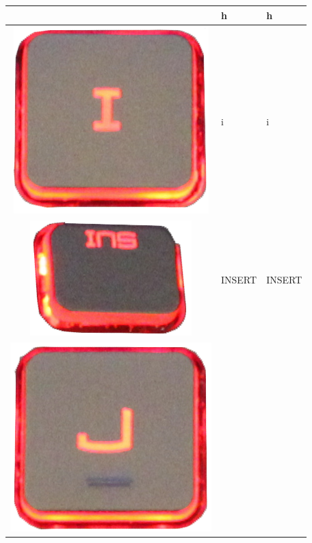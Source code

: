 \begin{longtable}{|cll|}
\begin{minipage}[c]{.4\textwidth}
\vspace{0.2cm}
\end{minipage} & h & h\\
\hline
\begin{minipage}[c]{.4\textwidth}
\vspace{0.2cm}
\includegraphics[scale=0.08]{Images/KeyMapping/i}
\vspace{0.2cm}
\end{minipage} & i & i\\
\hline
\begin{minipage}[c]{.4\textwidth}
\vspace{0.2cm}
\includegraphics[scale=0.08]{Images/KeyMapping/INSERT}
\vspace{0.2cm}
\end{minipage} & INSERT & INSERT\\
\hline
\begin{minipage}[c]{.4\textwidth}
\vspace{0.2cm}
\includegraphics[scale=0.08]{Images/KeyMapping/j}

\end{minipage}
\end{longtable}
